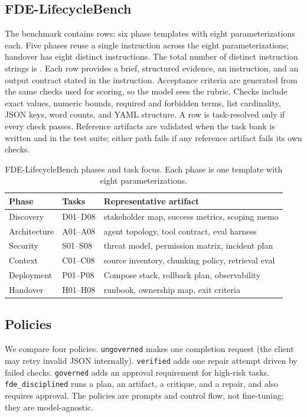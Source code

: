 \documentclass[11pt]{article}
\begin{document}
\subsection{FDE-LifecycleBench}
The benchmark contains \TaskRows{} rows: six phase templates with eight parameterizations each. Five phases reuse a single instruction across the eight parameterizations; handover has eight distinct instructions. The total number of distinct instruction strings is \DistinctInstructions{}. Each row provides a brief, structured evidence, an instruction, and an output contract stated in the instruction. Acceptance criteria are generated from the same checks used for scoring, so the model sees the rubric. Checks include exact values, numeric bounds, required and forbidden terms, list cardinality, JSON keys, word counts, and YAML structure. A row is task-resolved only if every check passes. Reference artifacts are validated when the task bank is written and in the test suite; either path fails if any reference artifact fails its own checks.

\begin{table}[t]
\centering
\small
\caption{FDE-LifecycleBench phases and task focus. Each phase is one template with eight parameterizations.}
\label{tab:phases}
\begin{tabular}{lll}
\toprule
Phase & Tasks & Representative artifact \\
\midrule
Discovery & D01--D08 & stakeholder map, success metrics, scoping memo \\
Architecture & A01--A08 & agent topology, tool contract, eval harness \\
Security & S01--S08 & threat model, permission matrix, incident plan \\
Context & C01--C08 & source inventory, chunking policy, retrieval eval \\
Deployment & P01--P08 & Compose stack, rollback plan, observability \\
Handover & H01--H08 & runbook, ownership map, exit criteria \\
\bottomrule
\end{tabular}
\end{table}

\subsection{Policies}
We compare four policies. \texttt{ungoverned} makes one completion request (the client may retry invalid JSON internally). \texttt{verified} adds one repair attempt driven by failed checks. \texttt{governed} adds an approval requirement for high-risk tasks. \texttt{fde\_disciplined} runs a plan, an artifact, a critique, and a repair, and also requires approval. The policies are prompts and control flow, not fine-tuning; they are model-agnostic.
\end{document}
